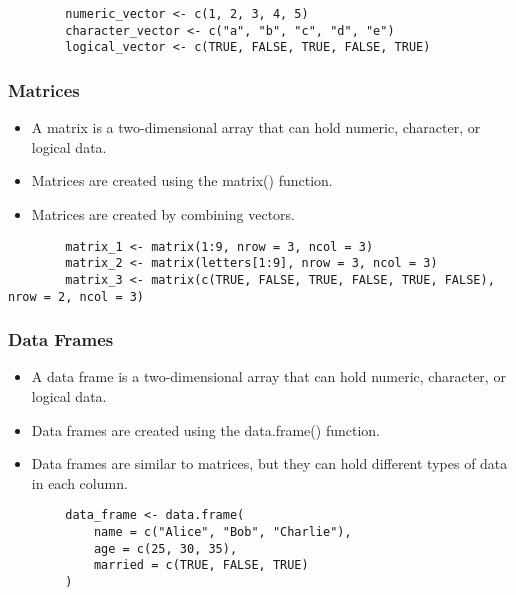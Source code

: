 \documentclass[serif, 9pt, aspectratio=32]{beamer}
\begin{document}
\begin{frame}[fragile]
    \begin{lstlisting}
        numeric_vector <- c(1, 2, 3, 4, 5)
        character_vector <- c("a", "b", "c", "d", "e")
        logical_vector <- c(TRUE, FALSE, TRUE, FALSE, TRUE)
    \end{lstlisting}
\end{frame}

\begin{frame}
    \centering
    \frametitle{Matrices}
    \begin{itemize}
        \setlength{\itemsep}{2em}
        \item A matrix is a two-dimensional array that can hold numeric, character, or logical data.
        \item Matrices are created using the matrix() function.
        \item Matrices are created by combining vectors.
    \end{itemize}
\end{frame}

\begin{frame}[fragile]
    \begin{lstlisting}
        matrix_1 <- matrix(1:9, nrow = 3, ncol = 3)
        matrix_2 <- matrix(letters[1:9], nrow = 3, ncol = 3)
        matrix_3 <- matrix(c(TRUE, FALSE, TRUE, FALSE, TRUE, FALSE), nrow = 2, ncol = 3)
    \end{lstlisting}
\end{frame}

\begin{frame}
    \centering
    \frametitle{Data Frames}
    \begin{itemize}
        \setlength{\itemsep}{2em}
        \item A data frame is a two-dimensional array that can hold numeric, character, or logical data.
        \item Data frames are created using the data.frame() function.
        \item Data frames are similar to matrices, but they can hold different types of data in each column.
    \end{itemize}
\end{frame}

\begin{frame}[fragile]
    \begin{lstlisting}
        data_frame <- data.frame(
            name = c("Alice", "Bob", "Charlie"),
            age = c(25, 30, 35),
            married = c(TRUE, FALSE, TRUE)
        )
    \end{lstlisting}
\end{frame}
\end{document}
